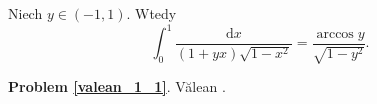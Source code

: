 %

\begin{problem_with_solution}
    \label{valean_1_1}%
    Niech $y \in (-1, 1)$.
    Wtedy
    \begin{equation}
        \int_0^1 \frac{\mathrm{d}x}{(1+yx) \sqrt{1-x^2}} = \frac{\arccos y}{\sqrt{1-y^2}}.
    \end{equation}
\end{problem_with_solution}


\textbf{Problem \ref{valean_1_1}}.
Vălean \cite[s. 1]{nahin15}.


%